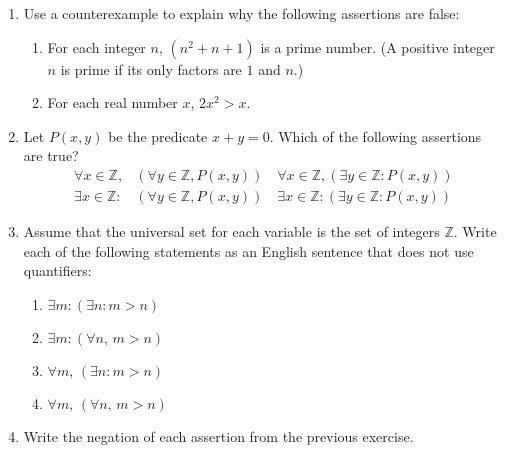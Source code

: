 \documentclass[letterpaper,12pt]{article}
\newcommand{\Z}{\mathbb{Z}}
\begin{document}
\begin{enumerate}
 \item Use a counterexample to explain why the following assertions are false:
\begin{enumerate}
 \item For each integer $n$, $(n^2+n+1)$ is a prime number. (A positive integer $n$ is prime if its only factors are $1$ and $n$.)
 \item For each real number $x$, $2x^2>x$.
\end{enumerate}
 \item Let $P(x,y)$ be the predicate $x+y=0$. Which of the following assertions are true?
\begin{align*}
 \forall x\in\Z, & (\forall y \in \Z, P(x,y))\quad \forall x\in \Z, (\exists y\in \Z : P(x,y))\\
 \exists x\in\Z : & (\forall y\in \Z, P(x,y))\quad \exists x\in\Z : (\exists y\in \Z: P(x,y))
\end{align*}
 \item Assume that the universal set for each variable is the set of integers $\Z$. Write each of the following statements as an English sentence that does not use quantifiers:
\begin{multicols}{2}
 \begin{enumerate}
  \item $\exists m : (\exists n:m>n)$
  \item $\exists m : (\forall n,\, m>n)$
  \item $\forall m, \,(\exists n : m>n)$
  \item $\forall m, \,(\forall n,\, m>n)$
 \end{enumerate}
\end{multicols}
 \item Write the negation of each assertion from the previous exercise.

\end{enumerate}
\end{document}
